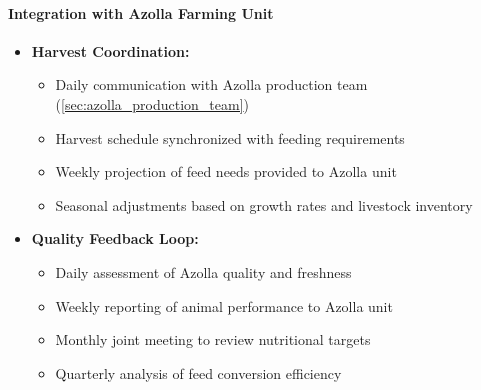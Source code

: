 \paragraph{Integration with Azolla Farming Unit}
\begin{itemize}
    \item \textbf{Harvest Coordination:}
    \begin{itemize}
        \item Daily communication with Azolla production team (\ref{sec:azolla_production_team})
        \item Harvest schedule synchronized with feeding requirements
        \item Weekly projection of feed needs provided to Azolla unit
        \item Seasonal adjustments based on growth rates and livestock inventory
    \end{itemize}
    \item \textbf{Quality Feedback Loop:}
    \begin{itemize}
        \item Daily assessment of Azolla quality and freshness
        \item Weekly reporting of animal performance to Azolla unit
        \item Monthly joint meeting to review nutritional targets
        \item Quarterly analysis of feed conversion efficiency
    \end{itemize}
\end{itemize}

